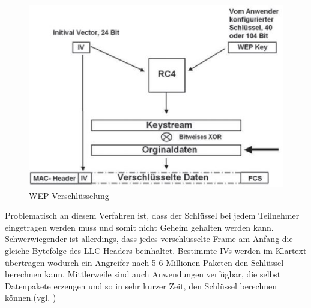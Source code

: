 \begin{figure} [htb]
\begin{centering}
\includegraphics{Bilder/Kapitel2/wep_funktionsweise.jpg}
\caption[WEP-Verschlüsselung]{WEP-Verschlüsselung \cite{SWB-430171331}}
\label{wep_funktionsweise}
\end{centering}
\end{figure}

Problematisch an diesem Verfahren ist, dass der Schlüssel bei jedem Teilnehmer eingetragen werden muss und somit nicht Geheim gehalten werden kann. Schwerwiegender ist allerdings, dass jedes verschlüsselte Frame am Anfang die gleiche Bytefolge des \ac{LLC}-Headers beinhaltet. Bestimmte \acp{IV} werden im Klartext übertragen wodurch ein Angreifer nach 5-6 Millionen Paketen den Schlüssel berechnen kann. Mittlerweile sind auch Anwendungen verfügbar, die selbst Datenpakete erzeugen und so in sehr kurzer Zeit, den Schlüssel berechnen können.(vgl. \cite{SWB-430171331})

